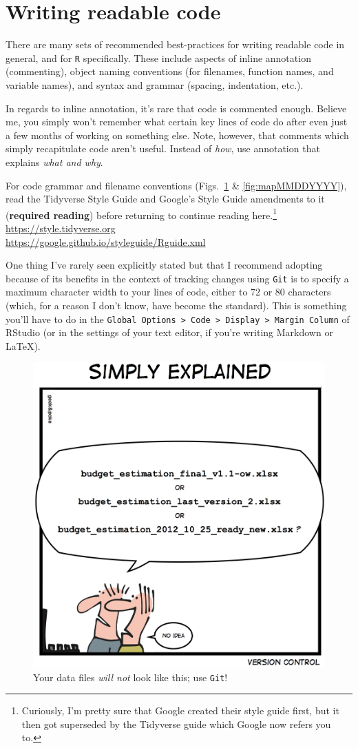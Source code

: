 \documentclass[12pt,letterpaper]{article}
\begin{document}
\section{Writing readable code}

There are many sets of recommended best-practices for writing readable code in general, and for 
\texttt{R} specifically.
These include aspects of inline annotation (commenting), object naming 
conventions (for filenames, function names, and variable names), and syntax 
and grammar (spacing, indentation, etc.).

In regards to inline annotation, it's rare that code is commented enough.
Believe me, you simply won't remember what certain key lines of code do after even just a few 
months of working on something else.
Note, however, that comments which simply recapitulate code aren't useful.
Instead of \emph{how}, use annotation that explains \emph{what and why}.

For code grammar and filename conventions (Figs.~\ref{fig:datafilenames} \& 
\ref{fig:mapMMDDYYYY}), read the Tidyverse Style Guide and Google's 
Style Guide amendments to it (\textbf{required reading}) before returning 
to continue reading here.\footnote{Curiously, I'm pretty sure that Google 
created their style guide first, but it then got superseded by the Tidyverse 
guide which Google now refers you to.}\\
\url{https://style.tidyverse.org}\\ 
\url{https://google.github.io/styleguide/Rguide.xml}

One thing I've rarely seen explicitly stated but that I recommend adopting because of its benefits in 
the context of tracking changes using \texttt{Git} is to specify a maximum character width to your 
lines of code, either to 72 or 80 characters (which, for a reason I don't know, have become the 
standard).
This is something you'll have to do in the \texttt{Global Options > Code > Display > Margin Column} 
of RStudio (or in the settings of your text editor, if you're writing Markdown or \LaTeX).

\begin{figure}[H]
	\centering
	\includegraphics[width=0.6\linewidth]{figs/datafilenames.png}
	\caption{Your data files \emph{will not} look like this; use \texttt{Git}!}
		\label{fig:datafilenames}
\end{figure}
\end{document}
